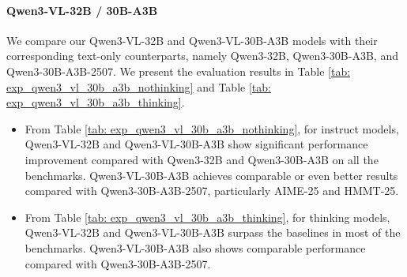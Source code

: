 \paragraph{Qwen3-VL-32B / 30B-A3B}
We compare our Qwen3-VL-32B and Qwen3-VL-30B-A3B models with their corresponding text-only counterparts, namely Qwen3-32B, Qwen3-30B-A3B, and Qwen3-30B-A3B-2507. We present the evaluation results in Table \ref{tab: exp_qwen3_vl_30b_a3b_nothinking} and Table \ref{tab: exp_qwen3_vl_30b_a3b_thinking}.

\begin{itemize}[itemindent=0pt, labelsep=4pt, leftmargin=*]
    \item From Table \ref{tab: exp_qwen3_vl_30b_a3b_nothinking}, for instruct models, Qwen3-VL-32B and Qwen3-VL-30B-A3B show significant performance improvement compared with Qwen3-32B and Qwen3-30B-A3B on all the benchmarks. Qwen3-VL-30B-A3B achieves comparable or even better results compared with Qwen3-30B-A3B-2507, particularly AIME-25 and HMMT-25.
    \item From Table \ref{tab: exp_qwen3_vl_30b_a3b_thinking}, for thinking models, Qwen3-VL-32B and Qwen3-VL-30B-A3B surpass the baselines in most of the benchmarks. Qwen3-VL-30B-A3B also shows comparable performance compared with Qwen3-30B-A3B-2507.
\end{itemize}  

